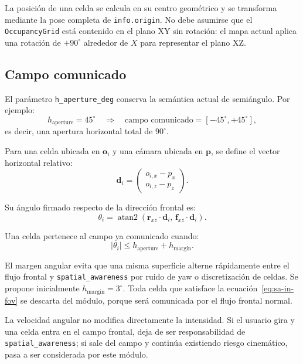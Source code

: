 La posición de una celda se calcula en su centro geométrico y se transforma
mediante la pose completa de \texttt{info.origin}. No debe asumirse que el
\texttt{OccupancyGrid} está contenido en el plano XY sin rotación: el mapa
actual aplica una rotación de $+90^\circ$ alrededor de $X$ para representar
el plano XZ.

\subsection{Campo comunicado}
\label{subsec:sa-fov}

El parámetro \texttt{h\_aperture\_deg} conserva la semántica actual de
semiángulo. Por ejemplo:
%
\begin{equation}
  h_{\text{aperture}}=45^\circ
  \quad\Longrightarrow\quad
  \text{campo comunicado}=[-45^\circ,+45^\circ],
\end{equation}
%
es decir, una apertura horizontal total de $90^\circ$.

Para una celda ubicada en $\mathbf{o}_i$ y una cámara ubicada en
$\mathbf{p}$, se define el vector horizontal relativo:
%
\begin{equation}
  \label{eq:sa-relative}
  \mathbf{d}_i =
  \begin{pmatrix}
    o_{i,x}-p_x\\
    o_{i,z}-p_z
  \end{pmatrix}.
\end{equation}

Su ángulo firmado respecto de la dirección frontal es:
%
\begin{equation}
  \label{eq:sa-angle}
  \theta_i =
  \operatorname{atan2}
  \left(
    \mathbf{r}_{xz}\cdot\mathbf{d}_i,\,
    \mathbf{f}_{xz}\cdot\mathbf{d}_i
  \right).
\end{equation}

Una celda pertenece al campo ya comunicado cuando:
%
\begin{equation}
  \label{eq:sa-in-fov}
  |\theta_i| \leq h_{\text{aperture}} + h_{\text{margin}}.
\end{equation}

El margen angular evita que una misma superficie alterne rápidamente entre el
flujo frontal y \texttt{spatial\_awareness} por ruido de yaw o discretización
de celdas. Se propone inicialmente
$h_{\text{margin}}=3^\circ$. Toda celda que satisface la
ecuación~\ref{eq:sa-in-fov} se descarta del módulo, porque será comunicada por
el flujo frontal normal.

La velocidad angular no modifica directamente la intensidad. Si el usuario
gira y una celda entra en el campo frontal, deja de ser responsabilidad de
\texttt{spatial\_awareness}; si sale del campo y continúa existiendo riesgo
cinemático, pasa a ser considerada por este módulo.

